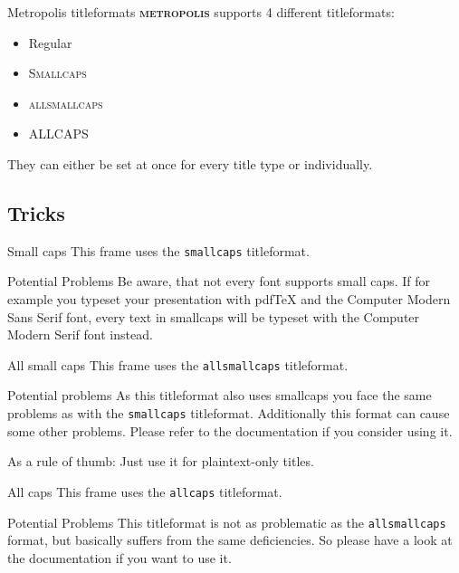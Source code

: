 \documentclass[10pt, aspectratio=169]{beamer}
\newcommand{\themename}{\textbf{\textsc{metropolis}}\xspace}
\begin{document}
\begin{frame}{Metropolis titleformats}
	\themename supports 4 different titleformats:
	\begin{itemize}
		\item Regular
		\item \textsc{Smallcaps}
		\item \textsc{allsmallcaps}
		\item ALLCAPS
	\end{itemize}
	They can either be set at once for every title type or individually.
\end{frame}

\subsection{Tricks}

{
\begin{frame}{Small caps}
	This frame uses the \texttt{smallcaps} titleformat.

	\begin{alertblock}{Potential Problems}
		Be aware, that not every font supports small caps. If for example you typeset your presentation with pdfTeX and the Computer Modern Sans Serif font, every text in smallcaps will be typeset with the Computer Modern Serif font instead.
	\end{alertblock}
\end{frame}
}

{
\begin{frame}{All small caps}
	This frame uses the \texttt{allsmallcaps} titleformat.

	\begin{alertblock}{Potential problems}
		As this titleformat also uses smallcaps you face the same problems as with the \texttt{smallcaps} titleformat. Additionally this format can cause some other problems. Please refer to the documentation if you consider using it.

		As a rule of thumb: Just use it for plaintext-only titles.
	\end{alertblock}
\end{frame}
}

{
\begin{frame}{All caps}
	This frame uses the \texttt{allcaps} titleformat.

	\begin{alertblock}{Potential Problems}
		This titleformat is not as problematic as the \texttt{allsmallcaps} format, but basically suffers from the same deficiencies. So please have a look at the documentation if you want to use it.
	\end{alertblock}
\end{frame}
}
\end{document}
